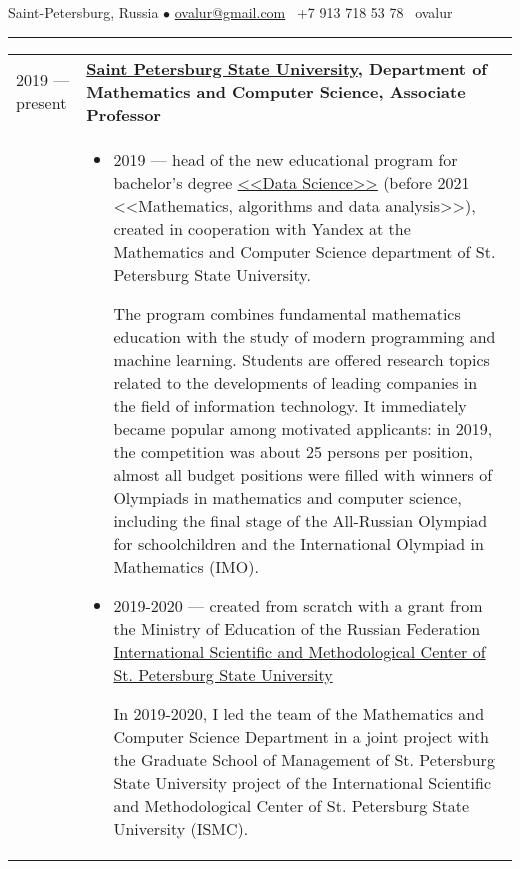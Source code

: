 \documentclass[11pt]{article}
\newif\ifdetailed
\begin{document}
%

\vspace{0.5em}

\noindent Saint-Petersburg, Russia $\bullet$ \href{mailto:ovalur@gmail.com}{ovalur@gmail.com} \faMobile~+7 913 718 53 78 \faSendO~ovalur

\vspace{0.5em}
\hrule
\vspace{1.0em}

\begin{longtable} {l | p{}}

2019 — present & {\textbf{\href{https://spbu.ru}{Saint Petersburg State University}, Department of Mathematics and Computer Science, Associate Professor}} \\
\ifdetailed
& \vspace{-1em}
\begin{itemize}
	\item 2019 — head of the new educational program for bachelor's degree \href{https://maad.compscicenter.ru}{<<Data Science>>} (before 2021 <<Mathematics, algorithms and data analysis>>), created in cooperation with Yandex at the Mathematics and Computer Science department of St. Petersburg State University.

    The program combines fundamental mathematics education with the study of modern programming and machine learning. Students are offered research topics related to the developments of leading companies in the field of information technology. It immediately became popular among motivated applicants: in 2019, the competition was about 25 persons per position, almost all budget positions were filled with winners of Olympiads in mathematics and computer science, including the final stage of the All-Russian Olympiad for schoolchildren and the International Olympiad in Mathematics (IMO).

    \item 2019-2020 — created from scratch with a grant from the Ministry of Education of the Russian Federation \href{https://gsom.spbu.ru/all_news/event2021-02-04/}{International Scientific and Methodological Center of St. Petersburg State University}

    In 2019-2020, I led the team of the Mathematics and Computer Science Department in a joint project with the Graduate School of Management of St. Petersburg State University project of the International Scientific and Methodological Center of St. Petersburg State University (ISMC).


\end{itemize}
\end{longtable}
\end{document}
